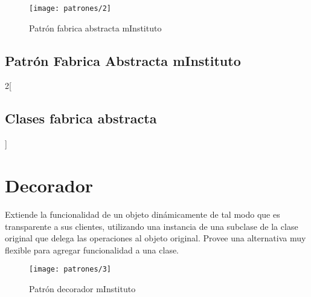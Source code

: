   \begin{figure}[H]
  	\centering
  	\texttt{[image: patrones/2]}
  	\captionsetup{width=.95\textwidth}
  	\caption{Patrón fabrica abstracta mInstituto}
  	\label{patron2}
  \end{figure}
  
  \subsection{Patrón Fabrica Abstracta mInstituto}
  \blindtext
  
  \begin{multicols}{2}[\subsection{Clases fabrica abstracta}]
    
    
    
    
    
    
    
    
    
    
  \end{multicols}
  
\section{Decorador}
Extiende la funcionalidad de un objeto dinámicamente de tal modo que es transparente a sus clientes, utilizando una instancia de una subclase de la clase original que delega las operaciones al objeto original. Provee una alternativa muy flexible para agregar funcionalidad a una clase.

\begin{figure}[H]
	\centering
	\texttt{[image: patrones/3]}
	\captionsetup{width=.95\textwidth}
	\caption{Patrón decorador mInstituto}
	\label{patron2}
\end{figure}

